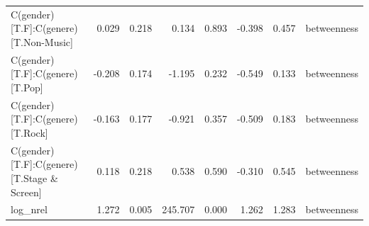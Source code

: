 \begin{table}
\begin{tabular}{lrrrrrrl}
             C(gender)[T.F]:C(genere)[T.Non-Music] &  0.029 & 0.218 &   0.134 & 0.893 & -0.398 &  0.457 & betweenness \\
                   C(gender)[T.F]:C(genere)[T.Pop] & -0.208 & 0.174 &  -1.195 & 0.232 & -0.549 &  0.133 & betweenness \\
                  C(gender)[T.F]:C(genere)[T.Rock] & -0.163 & 0.177 &  -0.921 & 0.357 & -0.509 &  0.183 & betweenness \\
        C(gender)[T.F]:C(genere)[T.Stage \& Screen] &  0.118 & 0.218 &   0.538 & 0.590 & -0.310 &  0.545 & betweenness \\
                                          log\_nrel &  1.272 & 0.005 & 245.707 & 0.000 &  1.262 &  1.283 & betweenness \\
\bottomrule
\end{tabular}
\end{table}
